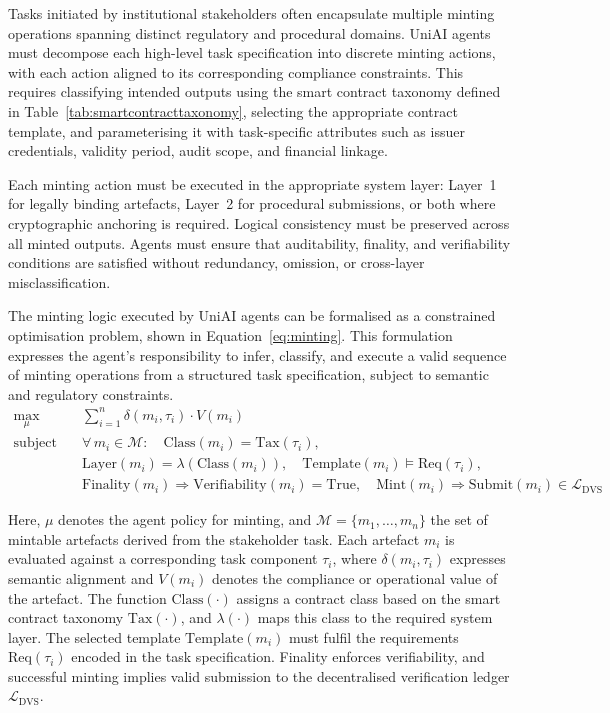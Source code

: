 \documentclass[oneside,10pt]{swissi}
\begin{document}
Tasks initiated by institutional stakeholders often encapsulate multiple minting operations spanning distinct regulatory and procedural domains. UniAI agents must decompose each high-level task specification into discrete minting actions, with each action aligned to its corresponding compliance constraints. This requires classifying intended outputs using the smart contract taxonomy defined in Table~\ref{tab:smartcontracttaxonomy}, selecting the appropriate contract template, and parameterising it with task-specific attributes such as issuer credentials, validity period, audit scope, and financial linkage.

Each minting action must be executed in the appropriate system layer: Layer~1 for legally binding artefacts, Layer~2 for procedural submissions, or both where cryptographic anchoring is required. Logical consistency must be preserved across all minted outputs. Agents must ensure that auditability, finality, and verifiability conditions are satisfied without redundancy, omission, or cross-layer misclassification.

The minting logic executed by UniAI agents can be formalised as a constrained optimisation problem, shown in Equation~\ref{eq:minting}. This formulation expresses the agent’s responsibility to infer, classify, and execute a valid sequence of minting operations from a structured task specification, subject to semantic and regulatory constraints.
\begin{align}
\label{eq:minting}
\max_{\mu} \quad & \sum_{i=1}^{n} \delta(m_i, \tau_i) \cdot V(m_i) \\
\text{subject to:} \quad
& \forall\, m_i \in \mathcal{M}: \quad \text{Class}(m_i) = \text{Tax}(\tau_i), \nonumber \\
& \text{Layer}(m_i) = \lambda(\text{Class}(m_i)), \quad \text{Template}(m_i) \models \text{Req}(\tau_i), \nonumber \\
& \text{Finality}(m_i) \Rightarrow \text{Verifiability}(m_i) = \text{True}, \quad \text{Mint}(m_i) \Rightarrow \text{Submit}(m_i) \in \mathcal{L}_{\text{DVS}} \nonumber
\end{align}

Here, $\mu$ denotes the agent policy for minting, and $\mathcal{M} = \{m_1, \dots, m_n\}$ the set of mintable artefacts derived from the stakeholder task. Each artefact $m_i$ is evaluated against a corresponding task component $\tau_i$, where $\delta(m_i, \tau_i)$ expresses semantic alignment and $V(m_i)$ denotes the compliance or operational value of the artefact. The function $\text{Class}(\cdot)$ assigns a contract class based on the smart contract taxonomy $\text{Tax}(\cdot)$, and $\lambda(\cdot)$ maps this class to the required system layer. The selected template $\text{Template}(m_i)$ must fulfil the requirements $\text{Req}(\tau_i)$ encoded in the task specification. Finality enforces verifiability, and successful minting implies valid submission to the decentralised verification ledger $\mathcal{L}_{\text{DVS}}$.
\end{document}
